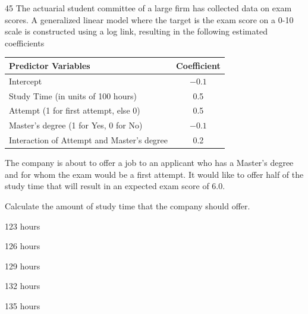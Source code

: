 \begin{question}{45}
The actuarial student committee of a large firm has collected data on exam scores. A generalized linear model where the target is the exam score on a 0-10 scale is constructed using a log link, resulting in the following estimated coefficients
\begin{center}
\begin{tabular}{|l|c|}
\hline
Predictor Variables & Coefficient \\ \hline
Intercept & $-0.1$ \\ \hline
Study Time (in units of 100 hours) & 0.5 \\ \hline
Attempt (1 for first attempt, else 0) & 0.5 \\ \hline
Master's degree (1 for Yes, 0 for No) & $-0.1$ \\ \hline
Interaction of Attempt and Master's degree & 0.2 \\ \hline
\end{tabular}
\end{center}

The company is about to offer a job to an applicant who has a Master's degree and for whom the exam would be a first attempt. It would like to offer half of the study time that will result in an expected exam score of 6.0.

Calculate the amount of study time that the company should offer.

\begin{choices}
\item 123 hours
\item 126 hours
\item 129 hours
\item 132 hours
\item 135 hours
\end{choices}
\end{question}

